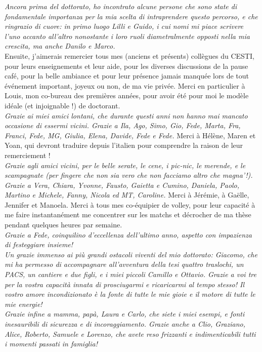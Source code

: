 \emph{Ancora prima del dottorato, ho incontrato alcune persone che sono state di fondamentale importanza per la mia scelta di intraprendere questo percorso, e che ringrazio di cuore: in primo luogo Lilli e Guido, i cui nomi mi piace scrivere l'uno accanto all'altro nonostante i loro ruoli diametralmente opposti nella mia crescita, ma anche Danilo e Marco.}\\

Ensuite, j'aimerais remercier tous mes (anciens et pr\'esents) coll\`{e}gues du CESTI, pour leurs enseignements et leur aide, pour les diverses discussions de la pause caf\'e, pour la belle ambiance et pour leur pr\'esence jamais manqu\'ee lors de tout \'ev\'enement important, joyeux ou non, de ma vie priv\'ee.  Merci en particulier \`a Louis, mon co-bureau des premi\`{e}res ann\'ees, pour avoir \'et\'e pour moi le mod\`{e}le id\'eale (et injoignable !) de doctorant.  \\

\emph{Grazie ai miei amici lontani, che durante questi anni non hanno mai mancato occasione di essermi vicini. Grazie a Ila, Ago, Simo, Gio, Fede, Marta, Fra, Franci, Fede, MG, Giulia,  Elena, Davide, Fede e Fede.} Merci \`a H\'el\`{e}ne, Maren et Yoan, qui devront traduire depuis l'italien pour comprendre la raison de leur remerciement ! \\

\emph{Grazie agli amici vicini, per le belle serate, le cene, i pic-nic, le merende, e le scampagnate (per fingere che non sia vero che non facciamo altro che magna'!). Grazie a Vera, Chiara, Yvonne, Fausto, Gaietta e Cumino, Daniela, Paolo, Martino e Michele, Fanny, Nicola ed MT, Caroline.} Merci \`a J\'er\'emie, \`a Ga\"elle, Jennifer et Manoela. Merci \`a tous mes co-\'equipier de volley, pour leur capacit\'{e} \`a me faire instantan\'ement me concentrer sur les matchs et d\'ecrocher de ma th\`{e}se pendant quelques heures par semaine. \\

\emph{Grazie a Fede, coinquilino d'eccellenza dell'ultimo anno, aspetto con impazienza di festeggiare insieme!}\\

\emph{Un grazie immenso ai pi\`u grandi ostacoli viventi del mio dottorato: Giacomo, che mi ha permesso di accompagnare all'avventura della tesi quattro traslochi, un PACS, un cantiere e due figli, e i miei piccoli Camillo e Ottavio. Grazie a voi tre per la vostra capacit\`a innata di prosciugarmi e ricaricarmi al tempo stesso! Il vostro amore incondizionato \`e la fonte di tutte le mie gioie e il motore di tutte le mie energie!}\\

\emph{Grazie infine a mamma, pap\`a, Laura e Carlo, che siete i miei esempi, e fonti inesauribili di sicurezza e di  incoraggiamento. Grazie anche a Clio, Graziano, Alice, Roberto, Samuele e Lorenzo, che avete reso frizzanti e indimenticabili tutti i momenti passati in famiglia!}